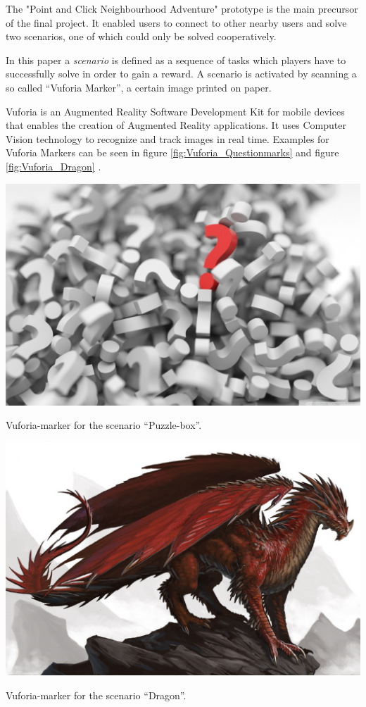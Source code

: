 \documentclass{sigchi-ext}
\begin{document}
The "Point and Click Neighbourhood Adventure" prototype is the main precursor of the final project. It enabled users to connect to other nearby users and solve two scenarios, one of which could only be solved cooperatively. 

In this paper a \textit{scenario} is defined as a sequence of tasks which players have to successfully solve in order to gain a reward. A scenario is activated by scanning a so called ``Vuforia Marker'', a certain image printed on paper. 

Vuforia is an Augmented Reality Software Development Kit for mobile devices that enables the creation of Augmented Reality applications. It uses Computer Vision technology to recognize and track images in real time. \cite{vuforiaExplanation} Examples for Vuforia Markers can be seen in figure \ref{fig:Vuforia_Questionmarks} \cite{puzzleBoxMarker} and figure \ref{fig:Vuforia_Dragon} \cite{dragonMarker}.

\begin{marginfigure}[0pc]
	\centering
	\begin{minipage}{\marginparwidth}
		\centering
		\includegraphics[width=1\marginparwidth]{figures/Vuforia_Questionmarks}
		\caption{Vuforia-marker for the scenario ``Puzzle-box''.}\label{fig:Vuforia_Questionmarks}
	\end{minipage}
	\begin{minipage}{\marginparwidth}
		\centering
		\includegraphics[width=1\marginparwidth]{figures/Vuforia_Dragon}
		\caption{Vuforia-marker for the scenario ``Dragon''.}\label{fig:Vuforia_Dragon}
	\end{minipage}
\end{marginfigure}
\end{document}
